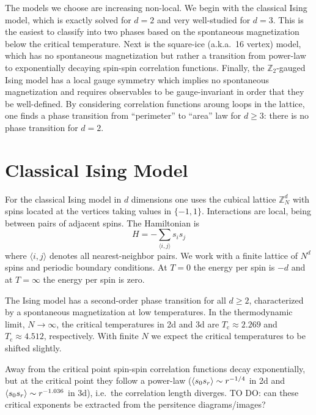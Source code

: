 \documentclass[11pt]{article}
\begin{document}
The models we choose are increasing non-local. We begin with the classical Ising model, which is exactly solved for $d=2$ and very well-studied for $d=3$. This is the easiest to classify into two phases based on the spontaneous magnetization below the critical temperature. Next is the square-ice (a.k.a.~16 vertex) model, which has no spontaneous magnetization but rather a transition from power-law to exponentially decaying spin-spin correlation functions. Finally, the $\mathbb{Z}_2$-gauged Ising model has a local gauge symmetry which implies no spontaneous magnetization and requires observables to be gauge-invariant in order that they be well-defined. By considering correlation functions aroung loops in the lattice, one finds a phase transition from ``perimeter'' to ``area'' law for $d\geq 3$: there is no phase transition for $d=2$.

\newpage
\section{Classical Ising Model}
For the classical Ising model in $d$ dimensions one uses the cubical lattice $\mathbb{Z}_N^d$ with spins located at the vertices taking values in $\{{-1},1\}$. Interactions are local, being between pairs of adjacent spins. The Hamiltonian is
\begin{equation}
    H = -\sum_{\langle i,j\rangle}s_is_j
\end{equation}
where $\langle i,j\rangle$ denotes all nearest-neighbor pairs. We work with a finite lattice of $N^d$ spins and periodic boundary conditions. At $T=0$ the energy per spin is $-d$ and at $T=\infty$ the energy per spin is zero.

The Ising model has a second-order phase transition for all $d\geq 2$, characterized by a spontaneous magnetization at low temperatures. In the thermodynamic limit, $N\to\infty$, the critical temperatures in 2d and 3d are $T_\text{c}\approx 2.269$ and $T_\text{c}\approx4.512$, respectively. With finite $N$ we expect the critical temperatures to be shifted slightly.

Away from the critical point spin-spin correlation functions decay exponentially, but at the critical point they follow a power-law ($\ev{s_0s_r}\sim r^{-1/4}$ in 2d and $\ev{s_0s_r}\sim r^{-1.036}$ in 3d), i.e.~the correlation length diverges. TO DO: can these critical exponents be extracted from the persitence diagrams/images?
\end{document}
